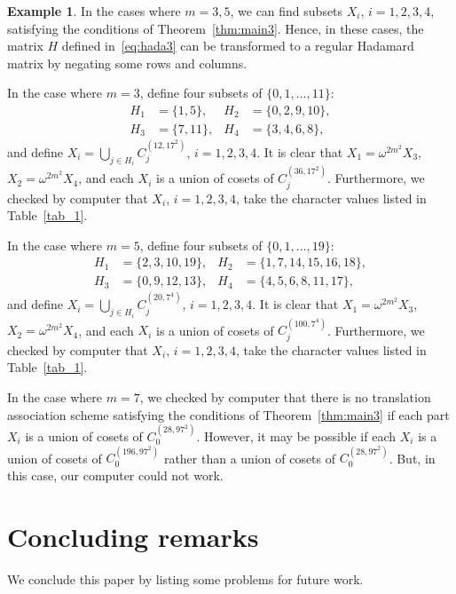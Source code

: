 \documentclass[10pt]{amsart}
\theoremstyle{definition}
\newtheorem*{exam*}{Example}
\begin{document}
\begin{exam*}
In the cases where $m=3,5$, we can find subsets $X_i$, $i=1,2,3,4$, satisfying the conditions of Theorem~\ref{thm:main3}. Hence, in these cases, the matrix $H$ defined in~\eqref{eq:hada3} can be transformed to a regular Hadamard matrix by negating some rows and columns.

In the case where $m=3$, define four subsets of $\{0,1,\ldots,11\}$:
\[
\begin{aligned}
H_1&=\{1,5\}, &H_2&=\{0,2,9,10\}, \\
H_3&=\{7,11\}, &H_4&=\{3,4,6,8\},
\end{aligned}
\]
and define $X_i=\bigcup_{j\in H_i}C_j^{(12,17^2)}$, $i=1,2,3,4$. It is clear that $X_1=\omega^{2m^2} X_3$, $X_2=\omega^{2m^2} X_4$, and each $X_i$ is a union of cosets of $C_j^{(36,17^2)}$. Furthermore, we checked by computer that $X_i$, $i=1,2,3,4$, take the character values listed in Table~\ref{tab_1}.

In the case where $m=5$, define four subsets of $\{0,1,\ldots,19\}$:
\[
\begin{aligned}
H_1&=\{2,3,10,19\}, & H_2&=\{1, 7, 14, 15, 16, 18\}, \\
H_3&=\{0,9,12,13\}, & H_4&=\{4, 5, 6, 8, 11, 17\},
\end{aligned}
\]
and define $X_i=\bigcup_{j\in H_i}C_j^{(20,7^4)}$, $i=1,2,3,4$. It is clear that $X_1=\omega^{2m^2} X_3$, $X_2=\omega^{2m^2} X_4$, and each $X_i$ is a union of cosets of $C_j^{(100,7^4)}$. Furthermore, we checked by computer that $X_i$, $i=1,2,3,4$, take the character values listed in Table~\ref{tab_1}.

In the case where $m=7$, we checked by computer that there is no translation association scheme satisfying the conditions of Theorem~\ref{thm:main3} if each part $X_i$ is a union of cosets of $C_0^{(28,97^2)}$. However, it may be possible if each $X_i$ is a union of cosets of $C_0^{(196,97^2)}$ rather than a union of cosets of $C_0^{(28,97^2)}$. But, in this case, our computer could not work.
\end{exam*}


\section{Concluding remarks}

We conclude this paper by listing some problems for future work.
\end{document}

